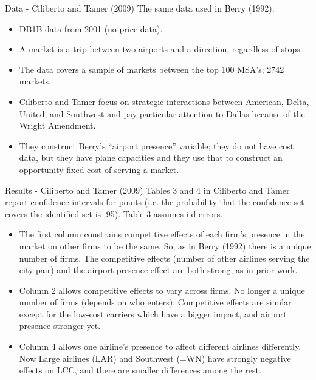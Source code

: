 \begin{frame}{Data - Ciliberto and Tamer (2009)}
The same data used in Berry (1992):
\begin{itemize}
\item DB1B data from 2001 (no price data).  
\item A market is a trip between two airports and a direction, regardless of stops. 
\item The data covers a sample of markets between the top 100 MSA's; 2742 markets.   \item Ciliberto and Tamer focus on strategic interactions between American, Delta, United, and Southwest and pay particular attention to Dallas because of the Wright Amendment.  
\item They construct Berry's ``airport presence'' variable; they do not have cost data, but they have plane capacities and they use that to construct an opportunity fixed cost of serving a market.
\end{itemize}
\end{frame}
\begin{frame}{Results - Ciliberto and Tamer (2009)}
\small
Tables 3 and 4 in Ciliberto and Tamer report confidence intervals for points (i.e. the probability that the confidence set covers the identified set is .95). Table 3 assumes iid errors.  \\
\begin{itemize}
\item The first column constrains competitive effects of each firm's presence in the market on other firms to be the
same.  So, as in Berry (1992) there is a unique number of
firms. The competitive effects (number of other airlines 
serving the city-pair) and the airport presence effect are
both strong, as in prior work.
\item Column 2 allows competitive effects to vary across firms. No longer
a unique number of firms (depends on who enters). Competitive effects 
are similar except for the low-cost carriers
which have a bigger impact, and airport presence stronger yet.\\
\item Column 4 allows one airline's presence to affect different airlines differently. Now Large airlines (LAR) and Southwest (=WN) have strongly negative effects on LCC, and there
are smaller differences among the rest.
\end{itemize}
\end{frame}

